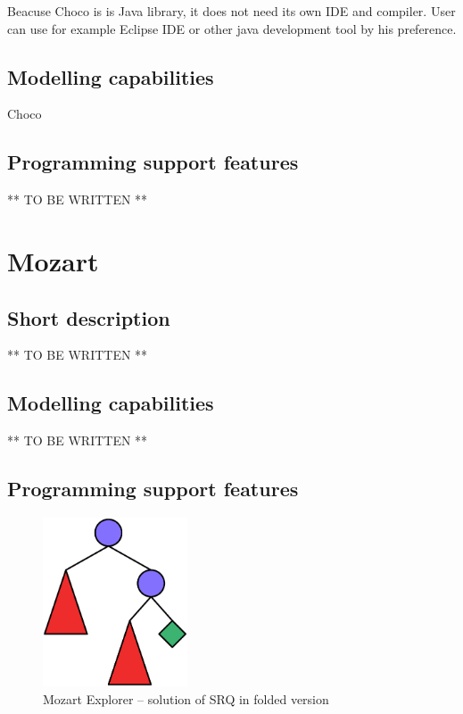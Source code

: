 Beacuse Choco is is Java library, it does not need its own IDE and compiler. User can
use for example Eclipse IDE or other java development tool by his preference.
 

\subsection{Modelling capabilities}

Choco 

\subsection{Programming support features}

** TO BE WRITTEN **

\section{Mozart}

\subsection{Short description}

** TO BE WRITTEN **

\subsection{Modelling capabilities}

** TO BE WRITTEN **

\subsection{Programming support features}

\begin{figure}
\caption{\label{srq-mozart-folded}Mozart Explorer -- solution of SRQ in folded version}
\begin{center}
\includegraphics[height=5cm]{images/mozart/srq.oz.color.folded.eps}
\end{center}
\end{figure}

